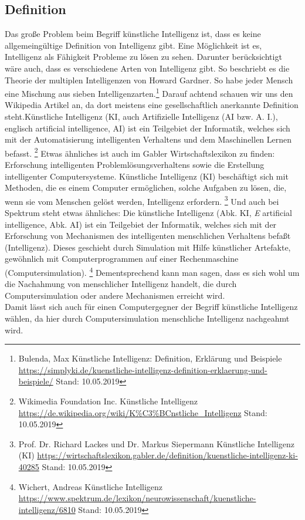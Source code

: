 \documentclass[12pt,a4paper,ngerman]{article}
\begin{document}
	\subsection{Definition}
	Das große Problem beim Begriff künstliche Intelligenz ist, dass es keine allgemeingültige Definition von Intelligenz gibt. Eine Möglichkeit ist es, Intelligenz als Fähigkeit Probleme zu lösen zu sehen. Darunter berücksichtigt wäre auch, dass es verschiedene Arten von Intelligenz gibt. So beschriebt es die \glqq Theorie der multiplen Intelligenzen \grqq{} von Howard Gardner. So habe jeder Mensch eine Mischung aus sieben Intelligenzarten.\footnote{Bulenda, Max \glqq Künstliche Intelligenz: Definition, Erklärung und Beispiele \grqq{}\url{https://simplyki.de/kuenstliche-intelligenz-definition-erklaerung-und-beispiele/} Stand: 10.05.2019} 
	Darauf achtend schauen wir uns den Wikipedia Artikel an, da dort meistens eine gesellschaftlich anerkannte Definition steht.\glqq Künstliche Intelligenz (KI, auch Artifizielle Intelligenz (AI bzw. A. I.), englisch artificial intelligence, AI) ist ein Teilgebiet der Informatik, welches sich mit der Automatisierung intelligenten Verhaltens und dem Maschinellen Lernen befasst. \grqq{} \footnote{Wikimedia Foundation Inc. \glqq Künstliche Intelligenz \grqq{} \url{https://de.wikipedia.org/wiki/K\%C3\%BCnstliche_Intelligenz} Stand: 10.05.2019 }
	Etwas ähnliches  ist auch im Gabler Wirtschaftslexikon zu finden: \glqq Erforschung intelligenten Problemlösungsverhaltens sowie die Erstellung intelligenter Computersysteme. Künstliche Intelligenz (KI) beschäftigt sich mit Methoden, die es einem Computer ermöglichen, solche Aufgaben zu lösen, die, wenn sie vom Menschen gelöst werden, Intelligenz erfordern. \grqq{} \footnote{Prof. Dr. Richard Lackes und Dr. Markus Siepermann \glqq Künstliche Intelligenz (KI) \grqq{} \url{https://wirtschaftslexikon.gabler.de/definition/kuenstliche-intelligenz-ki-40285} Stand: 10.05.2019 }
	Und auch bei Spektrum steht etwas ähnliches: \glqq Die künstliche Intelligenz (Abk. KI, \textit{E} artificial intelligence, Abk. AI) ist ein Teilgebiet der Informatik, welches sich mit der Erforschung von Mechanismen des intelligenten menschlichen Verhaltens befaßt (Intelligenz). Dieses geschieht durch Simulation mit Hilfe künstlicher Artefakte, gewöhnlich mit Computerprogrammen auf einer Rechenmaschine (Computersimulation).\grqq{} \footnote{Wichert, Andreas \glqq Künstliche Intelligenz \grqq{} \url{https://www.spektrum.de/lexikon/neurowissenschaft/kuenstliche-intelligenz/6810} Stand: 10.05.2019 }
	Dementsprechend kann man sagen, dass es sich wohl um die Nachahmung von menschlicher Intelligenz handelt, die durch Computersimulation oder andere Mechanismen erreicht wird.\\
	Damit lässt sich auch für einen Computergegner der Begriff künstliche Intelligenz wählen, da hier durch Computersimulation menschliche Intelligenz nachgeahmt wird.
\end{document}
